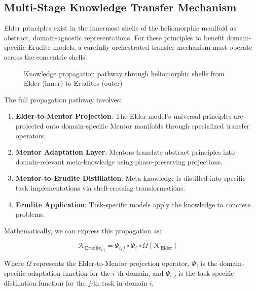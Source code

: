 \subsection{Multi-Stage Knowledge Transfer Mechanism}

Elder principles exist in the innermost shells of the heliomorphic manifold as abstract, domain-agnostic representations. For these principles to benefit domain-specific Erudite models, a carefully orchestrated transfer mechanism must operate across the concentric shells:

\begin{figure}[h]
\centering
\caption{Knowledge propagation pathway through heliomorphic shells from Elder (inner) to Erudites (outer)}
\label{fig:knowledge_propagation}
\end{figure}

The full propagation pathway involves:

\begin{enumerate}
    \item \textbf{Elder-to-Mentor Projection}: The Elder model's universal principles are projected onto domain-specific Mentor manifolds through specialized transfer operators.
    
    \item \textbf{Mentor Adaptation Layer}: Mentors translate abstract principles into domain-relevant meta-knowledge using phase-preserving projections.
    
    \item \textbf{Mentor-to-Erudite Distillation}: Meta-knowledge is distilled into specific task implementations via shell-crossing transformations.
    
    \item \textbf{Erudite Application}: Task-specific models apply the knowledge to concrete problems.
\end{enumerate}

Mathematically, we can express this propagation as:

\begin{equation}
\mathcal{K}_{\text{Erudite}_{i,j}} = \Psi_{i,j} \circ \Phi_i \circ \Omega(\mathcal{K}_{\text{Elder}})
\end{equation}

Where $\Omega$ represents the Elder-to-Mentor projection operator, $\Phi_i$ is the domain-specific adaptation function for the $i$-th domain, and $\Psi_{i,j}$ is the task-specific distillation function for the $j$-th task in domain $i$.

